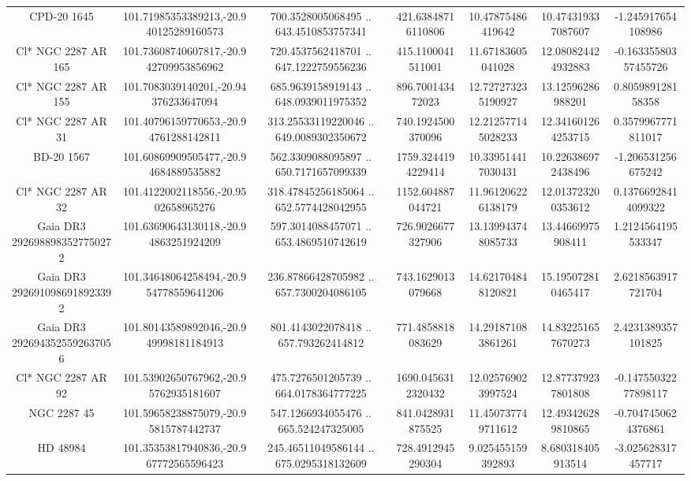 \begin{table}
\begin{tabular}{ccccccc}
CPD-20  1645 & 101.71985353389213,-20.940125289160573 & 700.3528005068495 .. 643.4510853757341 & 421.63848716110806 & 10.47875486419642 & 10.474319337087607 & -1.245917654108986 \\
Cl* NGC 2287     AR     165 & 101.73608740607817,-20.942709953856962 & 720.4537562418701 .. 647.1222759556236 & 415.1100041511001 & 11.67183605041028 & 12.080824424932883 & -0.16335580357455726 \\
Cl* NGC 2287     AR     155 & 101.7083039140201,-20.94376233647094 & 685.9639158919143 .. 648.0939011975352 & 896.700143472023 & 12.727273235190927 & 13.12596286988201 & 0.805989128158358 \\
Cl* NGC 2287     AR      31 & 101.40796159770653,-20.94761288142811 & 313.25533119220046 .. 649.0089302350672 & 740.1924500370096 & 12.212577145028233 & 12.341601264253715 & 0.3579967771811017 \\
BD-20  1567 & 101.60869909505477,-20.94684889535882 & 562.3309088095897 .. 650.7171657099339 & 1759.3244194229414 & 10.339514417030431 & 10.226386972438496 & -1.206531256675242 \\
Cl* NGC 2287     AR      32 & 101.4122002118556,-20.9502658965276 & 318.47845256185064 .. 652.5774428042955 & 1152.604887044721 & 11.961206226138179 & 12.013723200353612 & 0.13766928414099322 \\
Gaia DR3 2926988983527750272 & 101.63690643130118,-20.94863251924209 & 597.3014088457071 .. 653.4869510742619 & 726.9026677327906 & 13.139943748085733 & 13.44669975908411 & 1.2124564195533347 \\
Gaia DR3 2926910986918923392 & 101.34648064258494,-20.954778559641206 & 236.87866428705982 .. 657.7300204086105 & 743.1629013079668 & 14.621704848120821 & 15.195072810465417 & 2.6218563917721704 \\
Gaia DR3 2926943525592637056 & 101.80143589892046,-20.949998181184913 & 801.4143022078418 .. 657.793262414812 & 771.4858818083629 & 14.291871083861261 & 14.832251657670273 & 2.4231389357101825 \\
Cl* NGC 2287     AR      92 & 101.53902650767962,-20.95762935181607 & 475.7276501205739 .. 664.0178364777225 & 1690.0456312320432 & 12.025769023997524 & 12.877379237801808 & -0.14755032277898117 \\
NGC  2287    45 & 101.59658238875079,-20.95815787442737 & 547.1266934055476 .. 665.524247325005 & 841.0428931875525 & 11.450737749711612 & 12.493426289810865 & -0.7047450624376861 \\
HD  48984 & 101.35353817940836,-20.967772565596423 & 245.46511049586144 .. 675.0295318132609 & 728.4912945290304 & 9.025455159392893 & 8.680318405913514 & -3.025628317457717 \\

\end{tabular}
\end{table}
